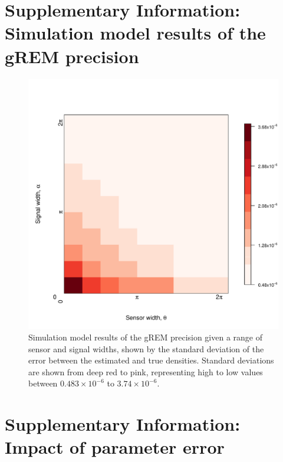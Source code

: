 

\vspace{1cm}




\clearpage
\section{Supplementary Information: Simulation model results of the gREM precision}
\setcounter{figure}{0}    




\begin{figure}[h!]
  \centering
	\includegraphics[width=\textwidth]{imgs/ResultStandardDeviation.pdf}
	\caption[gREM precision given a range of sensor and signal widths]{
Simulation model results of the gREM precision given a range of sensor and signal widths, shown by the standard deviation of the error between the estimated and true densities. 
Standard deviations are shown from deep red to pink, representing high to low values between $0.483\times10^{-6}$ to $3.74\times10^{-6}$. 
        } 
	\label{f:StandardDeviation}
\end{figure}


\clearpage
\section{Supplementary Information: Impact of parameter error}




